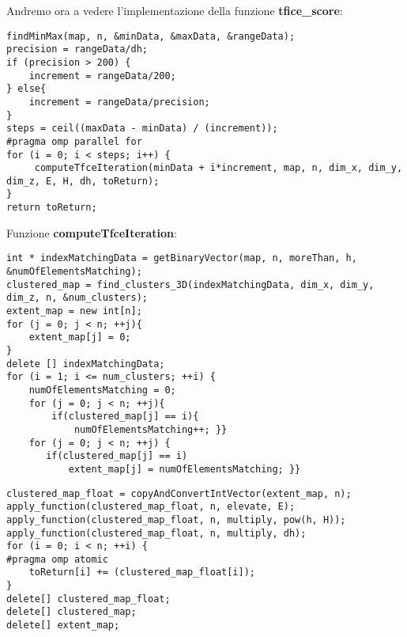 \documentclass{beamer}
\begin{document}
\begin{frame}[fragile]
Andremo ora a vedere l'implementazione della funzione \textbf{tfice\_score}:
\begin{center}
\begin{lstlisting}
findMinMax(map, n, &minData, &maxData, &rangeData);
precision = rangeData/dh;
if (precision > 200) {
    increment = rangeData/200;
} else{
    increment = rangeData/precision;	
}
steps = ceil((maxData - minData) / (increment));
#pragma omp parallel for
for (i = 0; i < steps; i++) {
     computeTfceIteration(minData + i*increment, map, n, dim_x, dim_y, dim_z, E, H, dh, toReturn);
}	
return toReturn;
\end{lstlisting}
\end{center}
\end{frame}

\begin{frame}[fragile]
Funzione \textbf{computeTfceIteration}:
\begin{center}
\begin{lstlisting}
int * indexMatchingData = getBinaryVector(map, n, moreThan, h, &numOfElementsMatching);
clustered_map = find_clusters_3D(indexMatchingData, dim_x, dim_y, dim_z, n, &num_clusters);
extent_map = new int[n];
for (j = 0; j < n; ++j){
    extent_map[j] = 0;
}
delete [] indexMatchingData;
for (i = 1; i <= num_clusters; ++i) {
    numOfElementsMatching = 0;	
    for (j = 0; j < n; ++j){
        if(clustered_map[j] == i){
            numOfElementsMatching++; }}
    for (j = 0; j < n; ++j) {
       if(clustered_map[j] == i)
           extent_map[j] = numOfElementsMatching; }}
\end{lstlisting}
\end{center}
\end{frame}

\begin{frame}[fragile]
\begin{center}
\begin{lstlisting}
clustered_map_float = copyAndConvertIntVector(extent_map, n);
apply_function(clustered_map_float, n, elevate, E);
apply_function(clustered_map_float, n, multiply, pow(h, H));
apply_function(clustered_map_float, n, multiply, dh);
for (i = 0; i < n; ++i) {
#pragma omp atomic
    toReturn[i] += (clustered_map_float[i]);
}
delete[] clustered_map_float;
delete[] clustered_map;
delete[] extent_map;
\end{lstlisting}
\end{center}
\end{frame}
\end{document}
